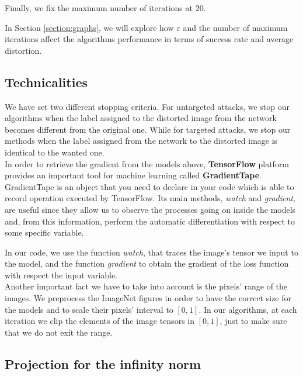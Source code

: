 \documentclass[10pt,twocolumn,letterpaper, english]{article}
\theoremstyle{definition}
\theoremstyle{plain}
\theoremstyle{plain}
\theoremstyle{plain}
\theoremstyle{plain}
\theoremstyle{remark}
\theoremstyle{remark}
\theoremstyle{definition}
\theoremstyle{definition}
\theoremstyle{definition}
\theoremstyle{definition}
\renewcommand{\epsilon}{\varepsilon}
\begin{document}
Finally, we fix the maximum number of iterations at $20$. 

\noindent In Section \ref{section:graphs}, we will explore how $\epsilon$ and the number of maximum iterations affect the algorithms performance in terms of success rate and average distortion. 

\subsection{Technicalities}


We have set two different stopping criteria.
For untargeted attacks, we stop our algorithms when the label assigned to the distorted image from the network becomes different from the original one.
While for targeted attacks, we stop our methods when the label assigned from the network to the distorted image is identical to the wanted one.\\ 


In order to retrieve the gradient from the models above, \textbf{TensorFlow} platform provides an important tool for machine learning called \textbf{GradientTape}. 
GradientTape is an object that you need to declare in your code which is able to record operation executed by TensorFlow.
Its main methods, \textit{watch} and \textit{gradient}, are useful since they allow us to observe the processes going on inside the models and, from this information, perform the automatic differentiation with respect to some specific variable.

In our code, we use the function \textit{watch}, that traces the image's tensor we input to the model, and the function \textit{gradient} to obtain the gradient of the loss function with respect the input variable.\\


Another important fact we have to take into account is the pixels' range of the images. 
We preprocess the ImageNet figures in order to have the correct size for the models and to scale their pixels' interval to $[0,1]$. 
In our algorithms, at each iteration we clip the elements of the image tensors in $[0,1]$, just to make sure that we do not exit the range. \\

\subsection{Projection for the infinity norm}
\label{sect:proje}
\end{document}
